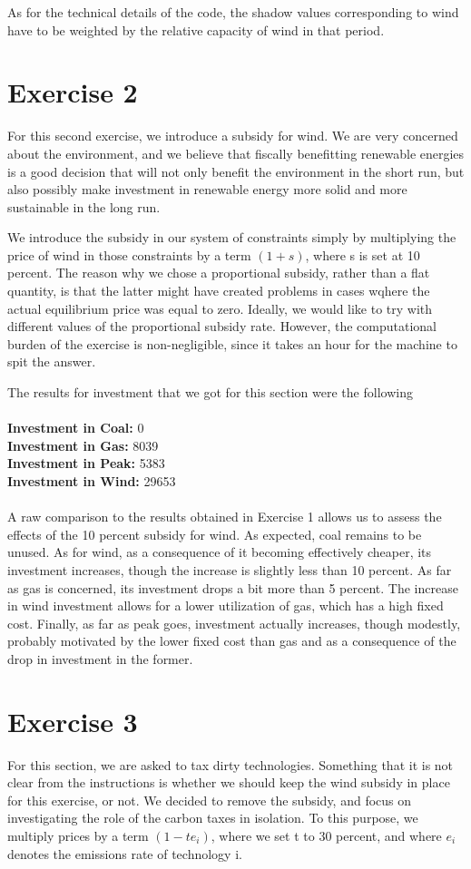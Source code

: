 \documentclass[12 pt]{article}
\begin{document}
As for the technical details of the code, the shadow values corresponding to wind have to be weighted by the relative capacity of wind in that period. 

\section*{Exercise 2}

For this second exercise, we introduce a subsidy for wind. We are very concerned about the environment, and we believe that fiscally benefitting renewable energies is a good decision that will not only benefit the environment in the short run, but also possibly make investment in renewable energy more solid and more sustainable in the long run.

We introduce the subsidy in our system of constraints simply by multiplying the price of wind in those constraints by a term $(1+s)$, where s is set at 10 percent. The reason why we chose a proportional subsidy, rather than a flat quantity, is that the latter might have created problems in cases wqhere the actual equilibrium price was equal to zero. Ideally, we would like to try with different values of the proportional subsidy rate. However, the computational burden of the exercise is non-negligible, since it takes an hour for the machine to spit the answer. 

The results for investment that we got for this section were the following \\
\\
\textbf{Investment in Coal:} 0 \\
\textbf{Investment in Gas:}  8039  \\
\textbf{Investment in Peak:} 5383 \\
\textbf{Investment in Wind:} 29653 \\
\\

A raw comparison to the results obtained in Exercise 1 allows us to assess the effects of the 10 percent subsidy for wind. As expected, coal remains to be unused. As for wind, as a consequence of it becoming effectively cheaper, its investment increases, though the increase is slightly less than 10 percent. As far as gas is concerned, its investment drops a bit more than 5 percent. The increase in wind investment allows for a lower utilization of gas, which has a high fixed cost. Finally, as far as peak goes, investment actually increases, though modestly, probably motivated by the lower fixed cost than gas and as a consequence of the drop in investment in the former.

\section*{Exercise 3}

For this section, we are asked to tax dirty technologies. Something that it is not clear from the instructions is whether we should keep the wind subsidy in place for this exercise, or not. We decided to remove the subsidy, and focus on investigating the role of the carbon taxes in isolation. To this purpose, we  multiply prices by a term $(1-te_i)$, where we set t to 30 percent, and where $e_i$ denotes the emissions rate of technology i.
\end{document}
